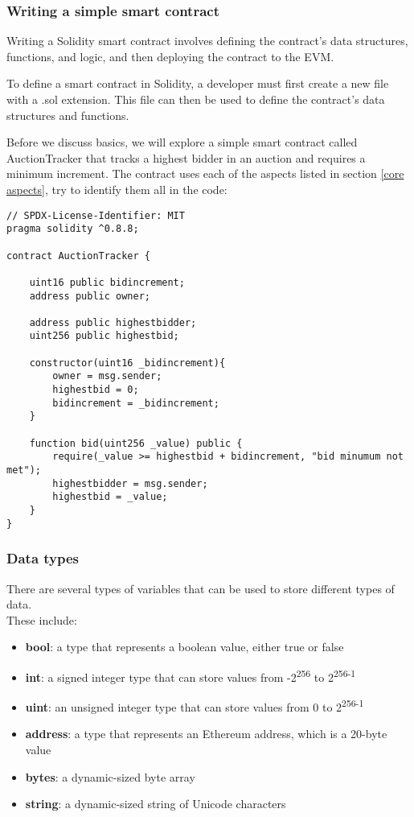 \documentclass{article}
\theoremstyle{theorem}
\theoremstyle{definition}
\theoremstyle{remark}
\begin{document}
\subsubsection{Writing a simple smart contract} \label{simple contract}
\medskip\noindent
Writing a Solidity smart contract involves defining the contract's data structures, functions, and logic, and then deploying the contract to the EVM.

\medskip\noindent
To define a smart contract in Solidity, a developer must first create a new file with a .sol extension. This file can then be used to define the contract's data structures and functions.

\medskip\noindent
Before we discuss basics, we will explore a simple smart contract called AuctionTracker that tracks a highest bidder in an auction and requires a minimum increment. The contract uses each of the aspects listed in section \ref{core aspects}, try to identify them all in the code:
\begin{itemize}
\begin{lstlisting}
// SPDX-License-Identifier: MIT
pragma solidity ^0.8.8;

contract AuctionTracker {

    uint16 public bidincrement;
    address public owner;
    
    address public highestbidder;
    uint256 public highestbid;
    
    constructor(uint16 _bidincrement){
        owner = msg.sender;
        highestbid = 0;
        bidincrement = _bidincrement;
    }

    function bid(uint256 _value) public {
        require(_value >= highestbid + bidincrement, "bid minumum not met");
        highestbidder = msg.sender;
        highestbid = _value;
    }
}
\end{lstlisting}
\end{itemize}

\subsubsection{Data types} \label{data}
\medskip\noindent
There are several types of variables that can be used to store different types of data. \\These include:
\begin{itemize}
    \item \textbf{bool}: a type that represents a boolean value, either true or false
    \item \textbf{int}: a signed integer type that can store values from -2\textsuperscript{256} to 2\textsuperscript{256-1}
    \item \textbf{uint}: an unsigned integer type that can store values from 0 to 2\textsuperscript{256-1}
    \item \textbf{address}: a type that represents an Ethereum address, which is a 20-byte value
    \item \textbf{bytes}: a dynamic-sized byte array
    \item \textbf{string}: a dynamic-sized string of Unicode characters


\end{itemize}
\end{document}
